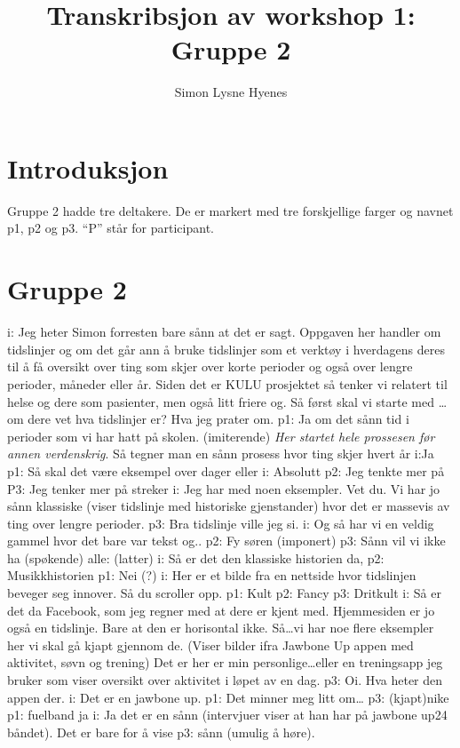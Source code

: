 \documentclass[11pt,UKenglish, a4paper]{article}
\author{Simon Lysne Hyenes}
\title{Transkribsjon av workshop 1: Gruppe 2}
\begin{document}
\maketitle{}
\section{Introduksjon}
Gruppe 2 hadde tre deltakere. De er markert med tre forskjellige farger og navnet p1, p2 og p3. ``P'' står for participant. 
\section{Gruppe 2}
i: Jeg heter Simon forresten bare sånn at det er sagt. Oppgaven her handler om tidslinjer og om det går ann å bruke tidslinjer som et verktøy i hverdagens deres til å få oversikt over ting som skjer over korte perioder og også over lengre perioder, måneder eller år. Siden det er KULU prosjektet så tenker vi relatert til helse og dere som pasienter, men også litt friere og. Så først skal vi starte med \dots om dere vet hva tidslinjer er? Hva jeg prater om. 
p1: Ja om det sånn tid i perioder som vi har hatt på skolen. (imiterende) \textit{Her startet hele prossesen før annen verdenskrig}. Så tegner man en sånn prosess hvor ting skjer hvert år
i:Ja
p1: Så skal det være eksempel over dager eller
i: Absolutt
p2: Jeg tenkte mer på
P3: Jeg tenker mer på streker
i: Jeg har med noen eksempler. Vet du. Vi har jo sånn klassiske (viser tidslinje med historiske gjenstander) hvor det er massevis av ting over lengre perioder.
p3: Bra tidslinje ville jeg si.
i: Og så har vi en veldig gammel hvor det bare var tekst og..
p2: Fy søren (imponert)
p3: Sånn vil vi ikke ha (spøkende)
alle: (latter)
i: Så er det den klassiske historien da, 
p2: Musikkhistorien
p1: Nei (?)
i: Her er et bilde fra en nettside hvor tidslinjen beveger seg innover. Så du scroller opp.
p1: Kult
p2: Fancy
p3: Dritkult
i: Så er det da Facebook, som jeg regner med at dere er kjent med. Hjemmesiden er jo også en tidslinje. Bare at den er horisontal ikke. Så\dots vi har noe flere eksempler her vi skal gå kjapt gjennom de. (Viser bilder ifra Jawbone Up appen med aktivitet, søvn og trening) Det er her er min personlige\dots eller en treningsapp jeg bruker som viser oversikt over aktivitet i løpet av en dag. 
p3: Oi. Hva heter den appen der.
i: Det er en jawbone up.
p1: Det minner meg litt om\dots
p3: (kjapt)nike
p1: fuelband ja
i: Ja det er en sånn (intervjuer viser at han har på jawbone up24 båndet). Det er bare for å vise
p3: sånn (\textcolor{myLy}{umulig å høre}). 
\end{document}
